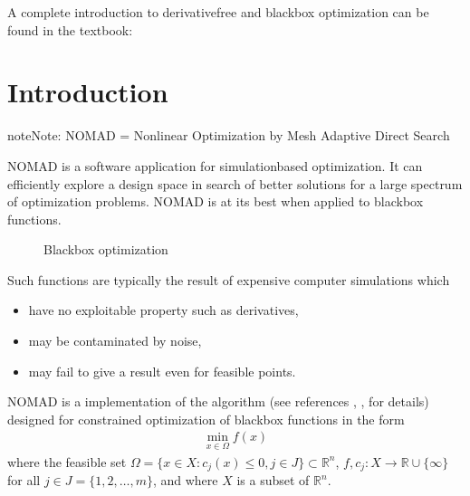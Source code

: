 \documentclass[letterpaper,10pt,english]{sphinxmanual}
\begin{document}
\begin{sphinxShadowBox}

\sphinxAtStartPar
{}
\end{sphinxShadowBox}

\sphinxAtStartPar
A complete introduction to derivative\sphinxhyphen{}free and blackbox optimization can be found in the textbook:


\chapter{Introduction}
\label{\detokenize{Introduction:introduction}}\label{\detokenize{Introduction:id1}}\label{\detokenize{Introduction::doc}}
\begin{sphinxadmonition}{note}{Note:}
\sphinxAtStartPar
NOMAD = Nonlinear Optimization by Mesh Adaptive Direct Search
\end{sphinxadmonition}

\sphinxAtStartPar
NOMAD is a software application for simulation\sphinxhyphen{}based optimization. It can efficiently explore a design space in search of better solutions for a large spectrum of optimization problems. NOMAD is at its best when  applied to blackbox functions.

\begin{figure}[htbp]
\centering
\capstart

\noindent{}
\caption{Blackbox optimization}\label{\detokenize{Introduction:id7}}\end{figure}

\sphinxAtStartPar
Such functions are typically the result of expensive computer simulations which
\begin{itemize}
\item {} 
\sphinxAtStartPar
have no exploitable property such as derivatives,

\item {} 
\sphinxAtStartPar
may be contaminated by noise,

\item {} 
\sphinxAtStartPar
may fail to give a result even for feasible points.

\end{itemize}

\sphinxAtStartPar
NOMAD  is a  implementation of the   algorithm (see references , ,  for details) designed for constrained optimization of blackbox functions in the form
\begin{equation*}
\begin{split}\min_{x \in \Omega} f(x)\end{split}
\end{equation*}
\sphinxAtStartPar
where the feasible set \(\Omega = \{ x \in X : c_j(x) \leq 0, j \in J\} \subset \mathbb{R}^n\), \(f, c_j : X \rightarrow \mathbb{R} \cup \{ \infty \}\) for  all \(j \in J= \{ 1,2,\ldots,m \}\), and where \(X\) is a subset of \(\mathbb{R}^n\).
\end{document}
